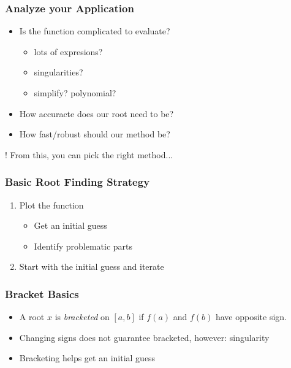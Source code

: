\documentclass[10pt]{beamer}
\begin{document}
\begin{frame}
\frametitle{Analyze your Application}
\begin{itemize}
  \item Is the function complicated to evaluate?
    \begin{itemize}
      \item lots of expresions?
      \item singularities?
      \item simplify?  polynomial?
    \end{itemize}
  \item How accuracte does our root need to be?
  \item How fast/robust should our method be?
\end{itemize}

\begin{alertblock}{!}
From this, you can pick the right method...
\end{alertblock}
\end{frame}
\begin{frame}
\frametitle{Basic Root Finding Strategy}
\begin{block}{}
\begin{enumerate}
  \item Plot the function
  \begin{itemize} 
    \item Get an initial guess
    \item Identify problematic parts
  \end{itemize}
  \item Start with the initial guess and iterate
\end{enumerate}
\end{block}
\end{frame}
\begin{frame}
\frametitle{Bracket Basics}
\begin{itemize}
  \item A root $x$ is \emph{bracketed} on $[a,b]$ if $f(a)$ and $f(b)$ have
  opposite sign.
  \item Changing signs does not guarantee bracketed, however: singularity
\item Bracketing helps get an initial guess
\end{itemize}
\end{frame}
\end{document}
